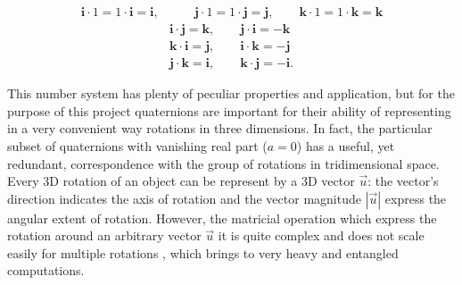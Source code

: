 \begin{align}
    \bm{i} \cdot 1 = 1 \cdot \bm{i} = \bm{i}, & \qquad  \bm{j} \cdot 1 = 1 \cdot \bm{j} = \bm{j}, \qquad \bm{k} \cdot 1 = 1 \cdot \bm{k} = \bm{k} \label{eq:Ham_prod}\\
    & \bm{i} \cdot \bm{j}= \bm{k}, \qquad \bm{j} \cdot \bm{i}= -\bm{k} \nonumber \\
    & \bm{k} \cdot \bm{i}= \bm{j}, \qquad \bm{i} \cdot \bm{k}= -\bm{j} \nonumber \\
    & \bm{j} \cdot \bm{k}= \bm{i}, \qquad \bm{k} \cdot \bm{j}= -\bm{i}. \nonumber
\end{align}

This number system has plenty of peculiar properties and application, but for the purpose of this project quaternions are important for their ability of representing in a very convenient way rotations in three dimensions. In fact, the particular subset of quaternions with vanishing real part ($a=0$) has a useful, yet redundant, correspondence with the group of rotations in tridimensional space. Every 3D rotation of an object can be represent by a 3D vector $\vec u$: the vector's direction indicates the axis of rotation and the vector magnitude $|\vec u|$ express the angular extent of rotation. However, the matricial operation which express the rotation around an arbitrary vector $\vec u$ it is quite complex and does not scale easily for multiple rotations \cite{10.1007/BFb0031048}, which brings to very heavy and entangled computations.

